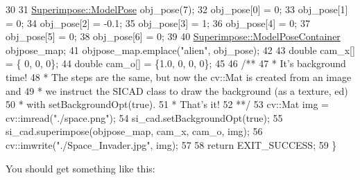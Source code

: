 \begin{DoxyCodeInclude}
30 
31     \mbox{\hyperlink{classSuperimpose_a85d40a5caf19f486d1e0c15c0a025378}{Superimpose::ModelPose}} obj\_pose(7);
32     obj\_pose[0] = 0;
33     obj\_pose[1] = 0;
34     obj\_pose[2] = -0.1;
35     obj\_pose[3] = 1;
36     obj\_pose[4] = 0;
37     obj\_pose[5] = 0;
38     obj\_pose[6] = 0;
39 
40     \mbox{\hyperlink{classSuperimpose_a178e3d4e2def6635bfcf9454dd4b5d22}{Superimpose::ModelPoseContainer}} objpose\_map;
41     objpose\_map.emplace(\textcolor{stringliteral}{"alien"}, obj\_pose);
42 
43     \textcolor{keywordtype}{double} cam\_x[] = \{  0, 0, 0\};
44     \textcolor{keywordtype}{double} cam\_o[] = \{1.0, 0, 0, 0\};
45 \textcolor{comment}{}
46 \textcolor{comment}{    /**}
47 \textcolor{comment}{     * It's background time!}
48 \textcolor{comment}{     * The steps are the same, but now the cv::Mat is created from an image and}
49 \textcolor{comment}{     * we instruct the SICAD class to draw the background (as a texture, ed)}
50 \textcolor{comment}{     * with setBackgroundOpt(true).}
51 \textcolor{comment}{     * That's it!}
52 \textcolor{comment}{     **/}
53     cv::Mat img = cv::imread(\textcolor{stringliteral}{"./space.png"});
54     si\_cad.setBackgroundOpt(\textcolor{keyword}{true});
55     si\_cad.superimpose(objpose\_map, cam\_x, cam\_o, img);
56     cv::imwrite(\textcolor{stringliteral}{"./Space\_Invader.jpg"}, img);
57 
58     \textcolor{keywordflow}{return} EXIT\_SUCCESS;
59 \}
\end{DoxyCodeInclude}


You should get something like this\+: 
